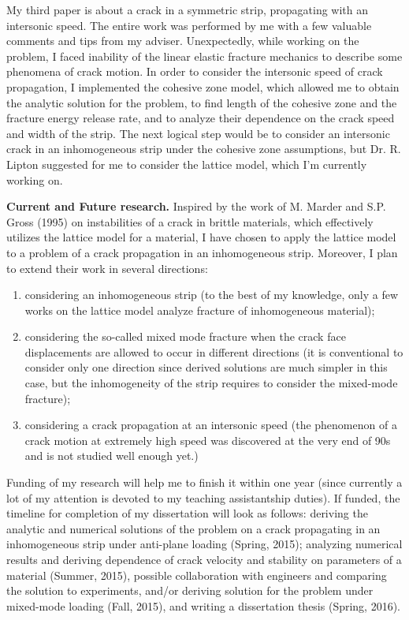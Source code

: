 \documentclass[11pt]{amsart}
\begin{document}
My third paper is about a crack in a symmetric strip, propagating with an intersonic speed. The entire work was performed by me with a few valuable comments and tips from my adviser. Unexpectedly, while working on the problem, I faced inability of the linear elastic fracture mechanics to describe some phenomena of crack motion. In order to consider the intersonic speed of crack propagation, I implemented the cohesive zone model, which allowed me to obtain the analytic solution for the problem, to find length of the cohesive zone and the fracture energy release rate, and to analyze their dependence on the crack speed and width of the strip. The next logical step would be to consider an intersonic crack in an inhomogeneous strip under the cohesive zone assumptions, but Dr. R. Lipton suggested for me to consider the lattice model, which I'm currently working on.

\bigskip

\textbf{Current and Future research.} Inspired by the work of M. Marder and S.P. Gross (1995) on instabilities of a crack in brittle materials, which effectively utilizes the lattice model for a material, I have chosen to apply the lattice model to a problem of a crack propagation in an inhomogeneous strip. Moreover, I plan to extend their work in several directions:
\begin{enumerate}
	\item considering an inhomogeneous strip (to the best of my knowledge, only a few works on the lattice model analyze fracture of inhomogeneous material);
    \item considering the so-called mixed mode fracture when the crack face displacements are allowed to occur in different directions (it is conventional to consider only one direction since derived solutions are much simpler in this case, but the inhomogeneity of the strip requires to consider the mixed-mode fracture);
    \item considering a crack propagation at an intersonic speed (the phenomenon of a crack motion at extremely high speed was discovered at the very end of 90s and is not studied well enough yet.)
\end{enumerate}

\bigskip

Funding of my research will help me to finish it within one year (since currently a lot of my attention is devoted to my teaching assistantship duties). If funded, the timeline for completion of my dissertation will look as follows: deriving the analytic and numerical solutions of the problem on a crack propagating in an inhomogeneous strip under anti-plane loading (Spring, 2015); analyzing numerical results and deriving dependence of crack velocity and stability on parameters of a material (Summer, 2015), possible collaboration with engineers and comparing the solution to experiments, and/or deriving solution for the problem under mixed-mode loading (Fall, 2015), and writing a dissertation thesis (Spring, 2016).
\end{document}
